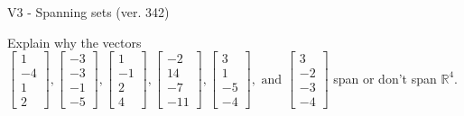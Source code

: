 \begin{exercise}
  \begin{exerciseTitle}V3 - Spanning sets (ver. 342)\end{exerciseTitle}
  \begin{exerciseStatement}
    Explain why the vectors \(\left[\begin{array}{r}
1 \\
-4 \\
1 \\
2
\end{array}\right] , \left[\begin{array}{r}
-3 \\
-3 \\
-1 \\
-5
\end{array}\right] , \left[\begin{array}{r}
1 \\
-1 \\
2 \\
4
\end{array}\right] , \left[\begin{array}{r}
-2 \\
14 \\
-7 \\
-11
\end{array}\right] , \left[\begin{array}{r}
3 \\
1 \\
-5 \\
-4
\end{array}\right] , \text{ and } \left[\begin{array}{r}
3 \\
-2 \\
-3 \\
-4
\end{array}\right]\) span or don't span \(\mathbb{R}^4\). 
	



\end{exerciseStatement}
\end{exercise}
